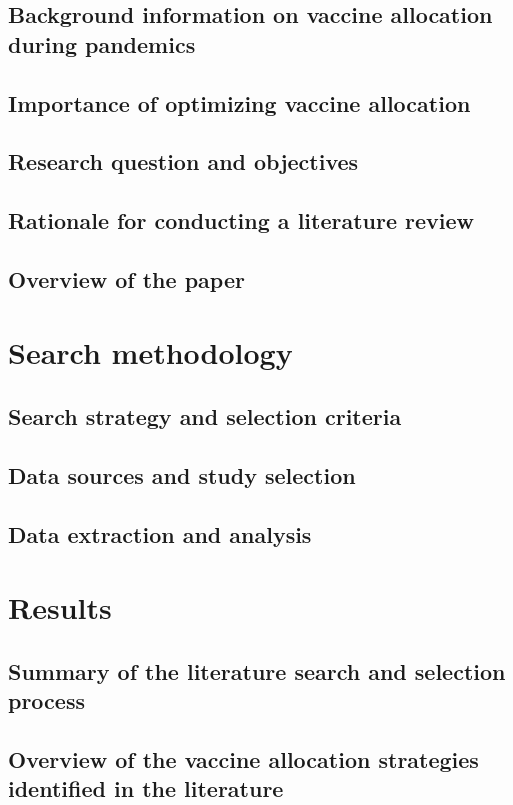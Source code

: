 \documentclass{article}
\begin{document}
\subsection{Background information on vaccine allocation during pandemics}
\label{sec:background}
\subsection{Importance of optimizing vaccine allocation}
\label{sec:importance}
\subsection{Research question and objectives}
\subsection{Rationale for conducting a literature review}
\subsection{Overview of the paper}


\section{Search methodology}
\label{sec:methodology}
\subsection{Search strategy and selection criteria}
\subsection{Data sources and study selection }
\subsection{Data extraction and analysis}

\section{Results}
\label{sec:results}
\subsection{Summary of the literature search and selection process }
\subsection{Overview of the vaccine allocation strategies identified in the literature}
\end{document}
